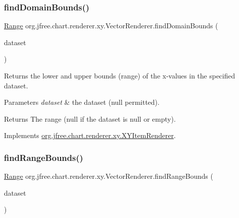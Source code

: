 \subsubsection{\texorpdfstring{find\+Domain\+Bounds()}{findDomainBounds()}}
{\footnotesize\ttfamily \mbox{\hyperlink{classorg_1_1jfree_1_1data_1_1_range}{Range}} org.\+jfree.\+chart.\+renderer.\+xy.\+Vector\+Renderer.\+find\+Domain\+Bounds (\begin{DoxyParamCaption}\item[{\mbox{\hyperlink{interfaceorg_1_1jfree_1_1data_1_1xy_1_1_x_y_dataset}{X\+Y\+Dataset}}}]{dataset }\end{DoxyParamCaption})}

Returns the lower and upper bounds (range) of the x-\/values in the specified dataset.


\begin{DoxyParams}{Parameters}
{\em dataset} & the dataset ({\ttfamily null} permitted).\\
\hline
\end{DoxyParams}
\begin{DoxyReturn}{Returns}
The range ({\ttfamily null} if the dataset is {\ttfamily null} or empty). 
\end{DoxyReturn}


Implements \mbox{\hyperlink{interfaceorg_1_1jfree_1_1chart_1_1renderer_1_1xy_1_1_x_y_item_renderer_a77925018c73214f58daac73147ba5e52}{org.\+jfree.\+chart.\+renderer.\+xy.\+X\+Y\+Item\+Renderer}}.

\mbox{\label{classorg_1_1jfree_1_1chart_1_1renderer_1_1xy_1_1_vector_renderer_a5e5c5df47a4d5b4dee4603bc04885995}} 
\subsubsection{\texorpdfstring{find\+Range\+Bounds()}{findRangeBounds()}}
{\footnotesize\ttfamily \mbox{\hyperlink{classorg_1_1jfree_1_1data_1_1_range}{Range}} org.\+jfree.\+chart.\+renderer.\+xy.\+Vector\+Renderer.\+find\+Range\+Bounds (\begin{DoxyParamCaption}\item[{\mbox{\hyperlink{interfaceorg_1_1jfree_1_1data_1_1xy_1_1_x_y_dataset}{X\+Y\+Dataset}}}]{dataset }\end{DoxyParamCaption})}


